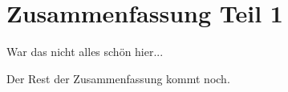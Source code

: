 \section{Zusammenfassung Teil 1}
War das nicht alles schön hier...

Der Rest der Zusammenfassung kommt noch.
